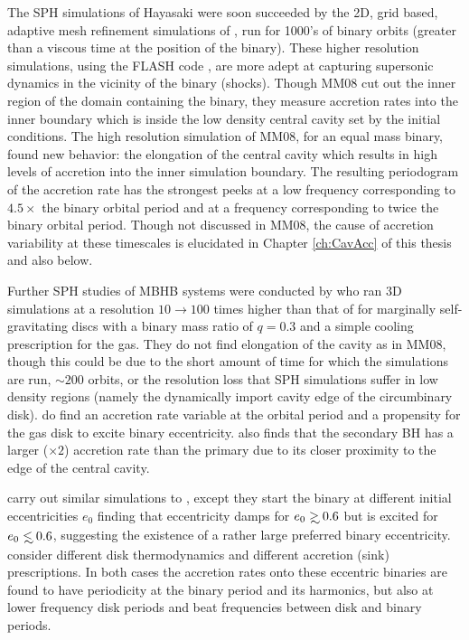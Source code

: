 The SPH simulations of Hayasaki were soon succeeded by the 2D, grid based,
adaptive mesh refinement simulations of \citep[][hereafter
MM08]{MacFadyen:2008},  run for 1000's of binary orbits (greater than a
viscous time at the position of the binary). These higher resolution
simulations, using the FLASH code \citep{Fryxell:2000}, are more adept at
capturing supersonic dynamics in the vicinity of the binary (shocks). Though
MM08 cut out the inner region of the domain containing the binary, they
measure accretion rates into the inner boundary which is inside the low
density central cavity set by the initial conditions. The high resolution
simulation of MM08, for an equal mass binary, found new behavior: the
elongation of the central cavity which results in high levels of accretion
into the inner simulation boundary. The resulting periodogram of the
accretion rate has the strongest peeks at a low frequency corresponding to
$4.5 \times$ the binary orbital period and at a frequency corresponding to
twice the binary orbital period. Though not discussed in MM08, the cause of
accretion variability at these timescales is elucidated in Chapter
\ref{ch:CavAcc} of this thesis and also \cite{ShiKrolik:2012} below.


Further SPH studies of MBHB systems were conducted by \cite{Cuadra:2009} who
ran 3D simulations at a resolution $10 \rightarrow 100$ times higher than that of
\cite{Hayasaki:2007} for marginally self-gravitating discs with a binary mass
ratio of $q=0.3$ and a simple cooling prescription for the gas. They do not
find elongation of the cavity as in MM08, though this could be due to the
short amount of time for which the simulations are run, $\sim 200$ orbits, or
the resolution loss that SPH simulations suffer in low density regions (namely
the dynamically import cavity edge of the circumbinary disk).
\cite{Cuadra:2009} do find an accretion rate variable at the orbital period
and a propensity for the gas disk to excite binary eccentricity.
\cite{Cuadra:2009} also finds that the secondary BH has a larger ($\times 2$)
accretion rate than the primary due to its closer proximity to the edge of
the central cavity.


\cite{Roedig:2012:Trqs} carry out similar simulations to \cite{Cuadra:2009}, except they start the binary at different initial eccentricities $e_0$ finding that eccentricity damps for $e_0 \gsim 0.6$ but is excited for $e_0 \lsim 0.6$, suggesting the existence of a rather large preferred binary eccentricity. \cite{Roedig:2011:eccevo} consider different disk thermodynamics and different accretion (sink) prescriptions. In both cases the accretion rates onto these eccentric binaries are found to have periodicity at the binary period and its harmonics, but also at lower frequency disk periods and beat frequencies between disk and binary periods.


